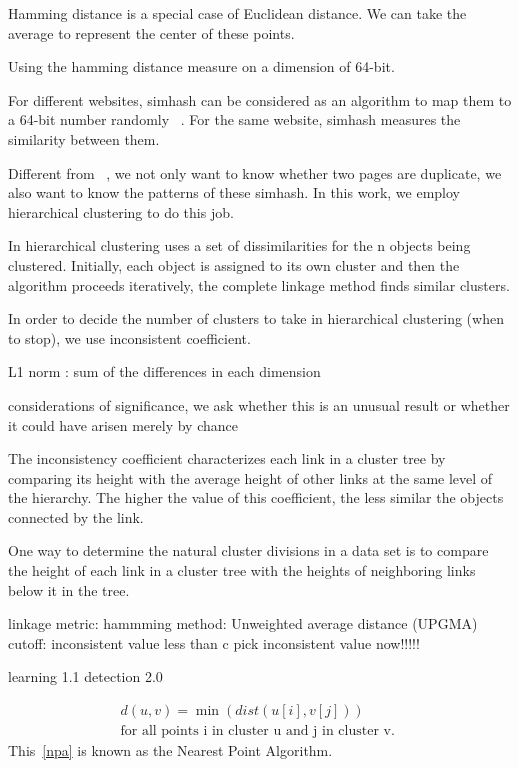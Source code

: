 Hamming distance is a special case of Euclidean distance. We can take the
average to represent the center of these points.


Using the hamming distance measure on a dimension of 64-bit.


For different websites, simhash can be considered as an algorithm to map them to
a 64-bit number randomly ~\cite{manku2007detecting}. For the same website,
simhash measures the similarity between them.

Different from ~\cite{manku2007detecting}, we not only want to know whether two pages are
duplicate, we also want to know the patterns of these simhash. In this work, we employ
hierarchical clustering to do this job.

In hierarchical clustering uses a set of dissimilarities for the n objects being clustered.
Initially, each object is assigned to its own cluster and then the algorithm
proceeds iteratively, the complete linkage method finds similar clusters.

In order to decide the number of clusters to take in hierarchical clustering
(when to stop), we use inconsistent coefficient.


L1 norm : sum of the differences in
each dimension

considerations of significance, we ask whether this is an unusual result or
whether it could have arisen merely by chance


The inconsistency coefficient characterizes each link in a cluster tree by
comparing its height with the average height of other links at the same level of
the hierarchy. The higher the value of this coefficient, the less similar the
objects connected by the link.

One way to determine the natural cluster divisions in a data set is to compare
the height of each link in a cluster tree with the heights of neighboring links
below it in the tree.

linkage metric: hammming
method: Unweighted average distance (UPGMA)
cutoff: inconsistent value less than c
pick inconsistent value now!!!!!

learning 1.1
detection 2.0


\begin{gather*} \label{npa}
  d(u,v) = \min(dist(u[i],v[j])) \\
  \text{for all points i in cluster u and j in
  cluster v. }
\end{gather*}
This~\autoref{npa} is known as the Nearest Point Algorithm.

